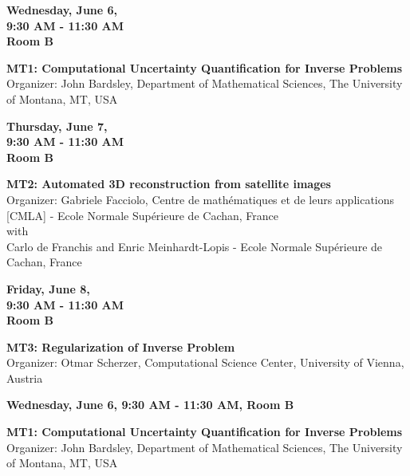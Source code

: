 \begin{center}\textbf{Wednesday, June 6, \\9:30 AM - 11:30 AM \\Room B}\end{center}
\begin{center}
\textbf{MT1: Computational Uncertainty Quantification for Inverse Problems}\\
Organizer: John Bardsley, Department of Mathematical Sciences, The University of Montana, MT, USA
\end{center}

\vspace{1cm}
\begin{center}\textbf{Thursday, June 7, \\9:30 AM - 11:30 AM \\Room B}\end{center}
\begin{center}
\textbf{MT2: Automated 3D reconstruction from satellite images}\\
Organizer: Gabriele Facciolo, Centre de math\'ematiques et de leurs applications [CMLA] - Ecole Normale Sup\'erieure de Cachan, France\\
with\\ Carlo de Franchis and Enric Meinhardt-Lopis - Ecole Normale Sup\'erieure de Cachan, France
\end{center}
\vspace{1cm}
\begin{center}\textbf{Friday, June 8, \\9:30 AM - 11:30 AM \\Room B}\end{center}
\begin{center}
\textbf{MT3: Regularization of Inverse Problem}\\
Organizer: Otmar Scherzer, Computational Science Center, University of Vienna, Austria
\end{center}

\newpage
\begin{center}\textbf{Wednesday, June 6, 9:30 AM - 11:30 AM, Room B}\end{center}
\begin{center}
\textbf{MT1: Computational Uncertainty Quantification for Inverse Problems}\\
Organizer: John Bardsley, Department of Mathematical Sciences, The University of Montana, MT, USA
\end{center}

